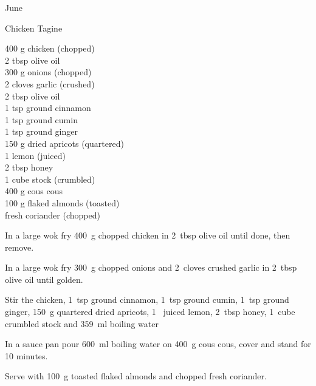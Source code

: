 \begin{menu}{June}
    \begin{recipe}{2}{Chicken Tagine}%
		\begin{ingredients}
		400 g chicken (chopped) \\
	2 tbsp olive oil  \\
	300 g onions (chopped) \\
	2 cloves garlic (crushed) \\
	2 tbsp olive oil  \\
	1 tsp ground cinnamon  \\
	1 tsp ground cumin  \\
	1 tsp ground ginger  \\
	150 g dried apricots (quartered) \\
	1  lemon (juiced) \\
	2 tbsp honey  \\
	1 cube stock (crumbled) \\
	400 g cous cous  \\
	100 g flaked almonds (toasted) \\
	  fresh coriander (chopped) \\
	
		\end{ingredients}
	
    \begin{instructions}
    \item 
        In a large wok fry
        400~g chopped chicken
        in
        2~tbsp  olive oil
        until done, then remove.
      \item 
        In a large wok fry
        300~g chopped onions
        and
        2~cloves crushed garlic
        in
        2~tbsp  olive oil
        until golden.
      \item 
        Stir the chicken,
        1~tsp  ground cinnamon,
        1~tsp  ground cumin,
        1~tsp  ground ginger,
        150~g quartered dried apricots,
        1~ juiced lemon,
        2~tbsp  honey,
        1~cube crumbled stock
        and
        359~ml  boiling water\item 
      In a
      sauce pan pour 600~ml  boiling water
      on 400~g  cous cous, cover and
      stand for 10 minutes.
    \item 
        Serve with
        100~g toasted flaked almonds
        and
         chopped fresh coriander.
      
    \end{instructions}
    \end{recipe}%
  
    \clearpage
    \end{menu}
	

